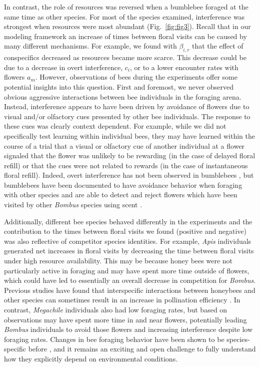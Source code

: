 \begin{refsection}
In contrast, the role of resources was reversed when a bumblebee foraged at the same time as other species. For most of the species examined, interference was strongest when resources were most abundant (Fig.~\ref{fig:fig3}). Recall that in our modeling framework an increase of times between floral visits can be caused by many different mechanisms. For example, we found with $\beta_{i,r}$ that the effect of conspecifics decreased as resources became more scarce. This decrease could be due to a decrease in overt interference, $c_{i}$, or to a lower encounter rates with flowers $a_{m}$. However, observations of bees during the experiments offer some potential insights into this question. First and foremost, we never observed obvious aggressive interactions between bee individuals in the foraging arena. Instead, interference appears to have been driven by avoidance of flowers due to visual and/or olfactory cues presented by other bee individuals. The response to these cues was clearly context dependent. For example, while we did not specifically test learning within individual bees, they may have learned within the course of a trial that a visual or olfactory cue of another individual at a flower signaled that the flower was unlikely to be rewarding (in the case of delayed floral refill) or that the cues were not related to rewards (in the case of instantaneous floral refill). Indeed, overt interference has not been observed in bumblebees \citep{heinrich_resource_1976, heinrich_bumblebee_2004}, but bumblebees have been documented to have avoidance behavior when foraging with other species \citep{morse_resource_1977, inouye_resource_1978} and  are able to detect and reject flowers which have been visited by other \textit{Bombus} species using scent \citep{goulson_foraging_1999}.

Additionally, different bee species behaved differently in the experiments and the contribution to the times between floral visits we found (positive and negative) was also reflective of competitor species identities. For example, \textit{Apis} individuals generated net increases in floral visits by decreasing the time between floral visits under high resource availability. This may be because honey bees were not particularly active in foraging and may have spent more time outside of flowers, which could have led to essentially an overall decrease in competition for \textit{Bombus}. Previous studies have found that interspecific interactions between honeybees and other species can sometimes result in an increase in pollination efficiency \citep{greenleaf_wild_2006}. In contrast, \textit{Megachile} individuals also had low foraging rates, but based on observations may have spent more time in and near flowers, potentially leading \textit{Bombus} individuals to avoid those flowers and increasing interference despite low foraging rates. Changes in bee foraging behavior have been shown to be species-specific before \citep{briggs_competitive_2016}, and it remains an exciting and open challenge to fully understand how they explicitly depend on environmental conditions.


\end{refsection}
